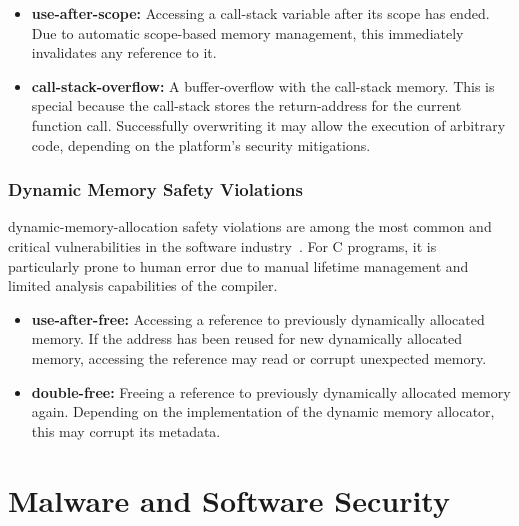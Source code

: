 \begin{itemize}
  \item \textbf{\Gls{use-after-scope}:} Accessing a \gls{call-stack} variable after its scope has ended. Due to automatic scope-based memory management, this immediately invalidates any reference to it.
  \item \textbf{\Gls{call-stack-overflow}:} A \gls{buffer-overflow} with the \gls{call-stack} memory. This is special because the \gls{call-stack} stores the \gls{return-address} for the current function call. Successfully overwriting it may allow the execution of arbitrary code, depending on the platform's security mitigations.
\end{itemize}

\subsubsection{Dynamic Memory Safety Violations}
\label{sec:dyn_mem_viol}

\Gls{dynamic-memory-allocation} safety violations are among the most common and critical vulnerabilities in the software industry~\cite{buff-ovf}. For \gls{C} programs, it is particularly prone to human error due to manual lifetime management and limited analysis capabilities of the compiler.

\begin{itemize}
  \item \textbf{\Gls{use-after-free}:} Accessing a reference to previously dynamically allocated memory. If the address has been reused for new dynamically allocated memory, accessing the reference may read or corrupt unexpected memory.
  \item \textbf{\Gls{double-free}:} Freeing a reference to previously dynamically allocated memory again. Depending on the implementation of the dynamic memory allocator, this may corrupt its metadata.
\end{itemize}

\section{Malware and Software Security}

